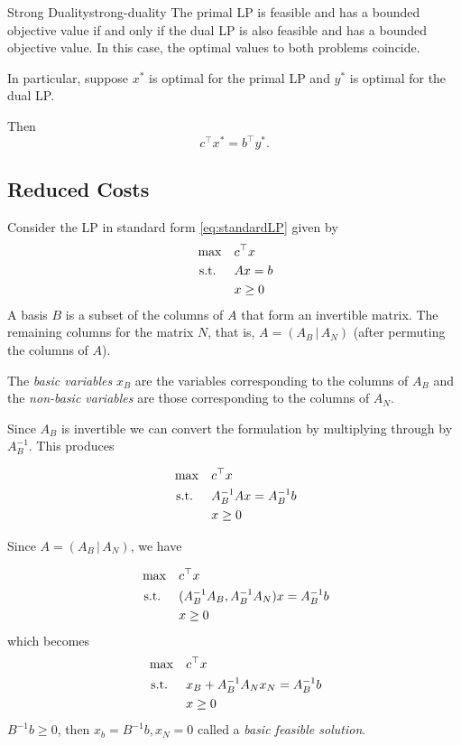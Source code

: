 \begin{theorem}{Strong Duality}{strong-duality}
The primal LP is feasible and has a bounded objective value if and only if the dual LP is also feasible and has a bounded objective value.  In this case, the optimal values to both problems coincide.

In particular, suppose $x^*$ is optimal for the primal LP and $y^*$ is optimal for the dual LP.

Then 
\begin{equation}
c^\top x^* = b^\top y^*.
\end{equation}
\end{theorem}

\subsection{Reduced Costs}
Consider the LP in standard form \eqref{eq:standardLP} given by 
\begin{equation}
\begin{split}
\max \quad & c^\top x\\
\mbox{ s.t. }  \quad & Ax = b\\
& x \geq 0
\end{split}
\end{equation}
 A basis $B$ is a subset of the columns of $A$ that form an invertible matrix.  The remaining columns for the matrix $N$, that is, $A = (A_B\, | \, A_N)$ (after permuting the columns of $A$).  
 
 The \emph{basic variables} $x_B$ are the variables corresponding to the columns of $A_B$ and the \emph{non-basic variables} are those corresponding to the columns of $A_N$.  
 
 Since $A_B$ is invertible we can convert the formulation by multiplying through by $A_B^{-1}$.  This produces
 
  \begin{equation}
\begin{split}
\max \quad & c^\top x\\
\mbox{ s.t. }  \quad & A_B^{-1}Ax = A_B^{-1}b\\
& x \geq 0
\end{split}
\end{equation}

Since $A = (A_B \,|\, A_N)$, we have 

  \begin{equation}
\begin{split}
\max \quad & c^\top x\\
\mbox{ s.t. }  \quad & (A_B^{-1}A_B, A_B^{-1} A_N) x = A_B^{-1}b\\
& x \geq 0
\end{split}
\end{equation}
which becomes 
 \begin{equation}
\begin{split}
\max \quad & c^\top x\\
\mbox{ s.t. }  \quad &x_B +  A_B^{-1} A_N x_N = A_B^{-1}b\\
& x \geq 0
\end{split}
\end{equation}
$B^{-1}b \geq 0$, then $x_b = B^{-1}b, x_N = 0$ called a \emph{basic feasible solution}.  

